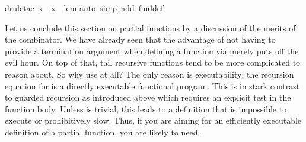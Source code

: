 \begin{isabellebody}
%
\isadelimproof
%
\endisadelimproof
%
\isatagproof
{}\isamarkupfalse%
{\isacharparenleft}drule{\isacharunderscore}tac\ x\ {\isacharequal}\ x\ \ lem{\isacharparenright}\isanewline
{}\isamarkupfalse%
{\isacharparenleft}auto\ simp\ add{\isacharcolon}\ find{}{\isacharunderscore}def{\isacharparenright}\isanewline
{}\isamarkupfalse%
%
\endisatagproof
{\isafoldproof}%
%
\isadelimproof
%
\endisadelimproof
%
\begin{isamarkuptext}%
Let us conclude this section on partial functions by a
discussion of the merits of the  combinator. We have
already seen that the advantage of not having to
provide a termination argument when defining a function via  merely puts off the evil hour. On top of that, tail recursive
functions tend to be more complicated to reason about. So why use
 at all? The only reason is executability: the recursion
equation for  is a directly executable functional
program. This is in stark contrast to guarded recursion as introduced
above which requires an explicit test  in the
function body.  Unless  is trivial, this leads to a
definition that is impossible to execute or prohibitively slow.
Thus, if you are aiming for an efficiently executable definition
of a partial function, you are likely to need .%
\end{isamarkuptext}%
\isamarkuptrue%
%
\isadelimtheory
%
\endisadelimtheory
%
\isatagtheory
%
\endisatagtheory
{\isafoldtheory}%
%
\isadelimtheory
%
\endisadelimtheory
\end{isabellebody}%
